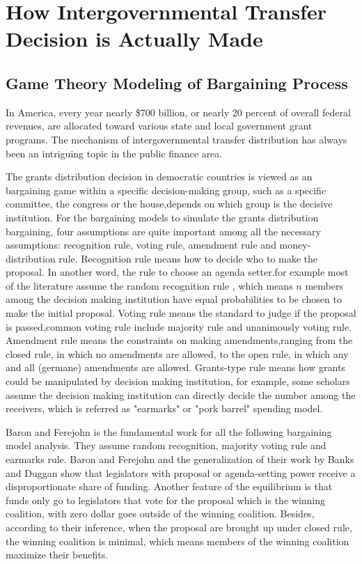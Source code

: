 \section{How Intergovernmental Transfer Decision is Actually Made}

\subsection{Game Theory Modeling of Bargaining Process}
In America, every year nearly \$700 billion, or nearly 20 percent of overall federal revenues, are allocated toward various state and local government grant programs. The mechanism of intergovernmental transfer distribution has always been an intriguing topic in the public finance area.

The grants distribution decision in democratic countries is viewed as an bargaining game within a specific decision-making group, such as a specific committee, the congress or the house,depends on which group is the decisive institution. For the bargaining models to simulate the grants distribution bargaining, four assumptions are quite important among all the necessary assumptions: recognition rule, voting rule, amendment rule and money-distribution rule. Recognition rule means how to decide who to make the proposal. In another word, the rule to choose an agenda setter.for example most of the literature assume the random recognition rule \cite{kalandrakis2004three,anesi2015bargaining,diermeier2011legislative,rosenstiel2021congressional}, which means $n$ members among the decision making institution have equal probabilities to be chosen to make the initial proposal. Voting rule means the standard to judge if the proposal is passed,common voting rule include majority rule and unanimously voting rule. Amendment rule means the constraints on making amendments,ranging from the closed rule, in which no amendments are allowed, to the open rule, in which any and all (germane) amendments are allowed. Grants-type rule means how grants could be manipulated by decision making institution, for example, some scholars assume the decision making institution can directly decide the number among the receivers, which is referred as "earmarks" or "pork barrel" spending model.

Baron and Ferejohn \cite{baron1989bargaining} is the fundamental work for all the following bargaining model analysis. They assume random recognition, majority voting rule and earmarks rule. Baron and Ferejohn \cite{baron1989bargaining} and the generalization of their work by Banks and Duggan\cite{banks2006general} show that legislators with proposal or agenda-setting power receive a disproportionate share of funding. Another feature of the equilibrium is that funds only go to legislators that vote for the proposal which is the winning coalition, with zero dollar goes outside of the winning coalition. Besides, according to their inference, when the proposal are brought up under closed rule, the winning coalition is minimal, which means members of the winning coalition maximize their benefits.

